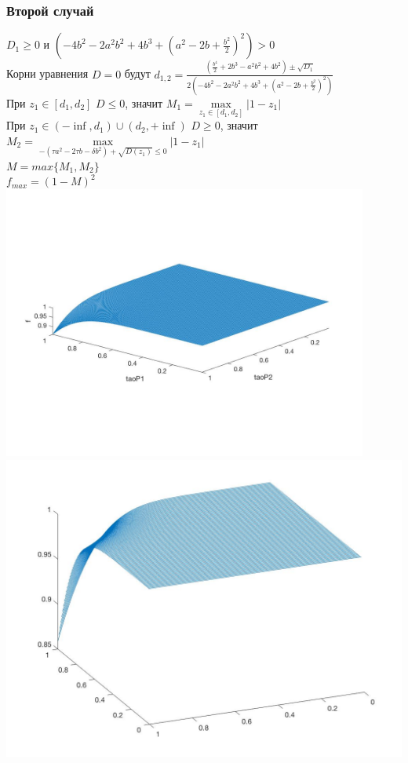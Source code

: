\documentclass[a4paper]{article}
\begin{document}
 \subsubsection{Второй случай}
$D_1 \geq 0$ и $(-4b^2-2a^2b^2+4b^3+(a^2-2b+\frac{b^2}{2})^2) > 0$\\
Корни уравнения $D = 0$ будут $d_{1,2} = \frac{(\frac{b^4}{2}+2b^3-a^2b^2+4b^2)\pm\sqrt{D_1}}{2(-4b^2-2a^2b^2+4b^3+(a^2-2b+\frac{b^2}{2})^2)}$\\
 При $z_1\in[d_1, d_2]$ $ D \leq 0$, значит $M_1 = \max\limits_{z_1\in[d_1, d_2]}{|1-z_1|}$\\
 При $z_1\in(-\inf, d_1)\cup(d_2, +\inf)$ $ D \geq 0$, значит $M_2 = \max\limits_{-(\tau a^2-2 \tau b - \delta b^2)+\sqrt{D(z_1)} \leq 0  }{|1-z_1|}$\\
 $M = max\{ M_1, M_2\}$\\
 $f_{max} = (1-M)^2$\\
 
\includegraphics[width=12cm]{Images/filter1.jpg}\\
\includegraphics[width=20cm]{Images/filter1-1.jpg}
 
\end{document}
